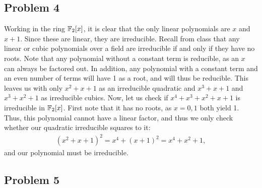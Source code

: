 \documentclass{../../mathnotes}
\begin{document}
\subsection*{Problem 4}

Working in the ring $\mathbb{F}_2[x]$, it is clear that the only linear polynomials are $x$ and $x+1$. Since these are
linear, they are irreducible. Recall from class that any linear or cubic polynomials over a field are
irreducible if and only if they have no roots. Note that any polynomial without a constant term is reducible,
as an $x$ can always be factored out. In addition, any polynomial with a constant term and an even number of
terms will have 1 as a root, and will thus be reducible. This leaves us with only $x^2+x+1$ as an irreducible
quadratic and $x^3+x+1$ and $x^3+x^2+1$ as irreducible cubics. Now, let us check if $x^4+x^3+x^2+x+1$ is
irreducible in $\mathbb{F}_2[x]$. First note that it has no roots, as $x=0,1$ both yield 1. Thus, this polynomial
cannot have a linear factor, and thus we only check whether our quadratic irreducible squares to it:
\begin{align*}
    (x^2+x+1)^2=x^4+(x+1)^2=x^4+x^2+1,
\end{align*}
and our polynomial must be irreducible.

\subsection*{Problem 5}
\end{document}
